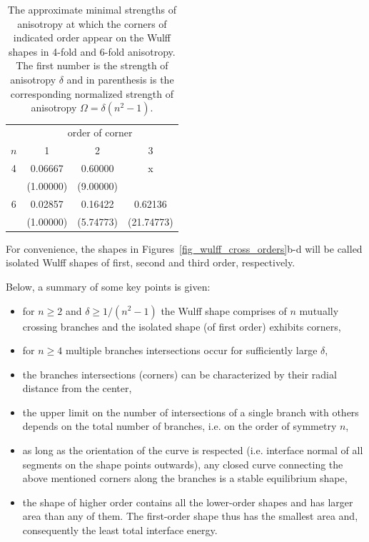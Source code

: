 	\begin{table}[b]
		\centering
		\caption[The approximate minimal strengths of anisotropy at which the corners of indicated order appear on the Wulff shapes in 4-fold and 6-fold anisotropy]{The approximate minimal strengths of anisotropy at which the corners of indicated order appear on the Wulff shapes in 4-fold and 6-fold anisotropy. The first number is the strength of anisotropy $\delta$ and in parenthesis is the corresponding normalized strength of anisotropy $\Omega=\delta(n^2-1)$.}
		\label{tab_soa_ears_crossing}
		\begin{tabular}{c|c|c|c}
			\hline
			& \multicolumn{3}{c}{order of corner}      \\ 
			$n$ & 1                 & 2                 & 3                  \\ \hline
			4   & 0.06667  & 0.60000  & x                  \\
			& (1.00000) & (9.00000) & \\
			6   & 0.02857  & 0.16422  & 0.62136  \\
			& (1.00000) & (5.74773) & (21.74773)\\
			\hline
		\end{tabular}
	\end{table}
	
	For convenience, the shapes in Figures~\ref{fig_wulff_cross_orders}b-d will be called isolated Wulff shapes of first, second and third order, respectively.
	
	Below, a summary of some key points is given:
	\begin{itemize}
		\item for $n\geq2$ and $\delta\geq 1/(n^2-1)$ the Wulff shape comprises of $n$ mutually crossing branches and the isolated shape (of first order) exhibits corners,
		\item for $n\geq4$ multiple branches intersections occur for sufficiently large $\delta$,
		\item the branches intersections (corners) can be characterized by their radial distance from the center,
		\item the upper limit on the number of intersections of a single branch with others depends on the total number of branches, i.e. on the order of symmetry $n$,
		\item as long as the orientation of the curve is respected (i.e. interface normal of all segments on the shape points outwards), any closed curve connecting the above mentioned corners along the branches is a stable equilibrium shape,
		\item the shape of higher order contains all the lower-order shapes and has larger area than any of them. The first-order shape thus has the smallest area and, consequently the least total interface energy. 
	\end{itemize}
	

